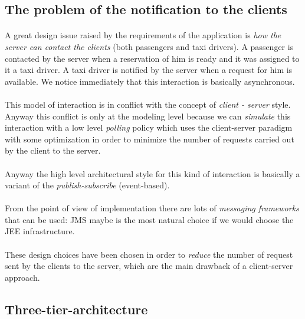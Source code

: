 \subsection{The problem of the notification to the clients}
\paragraph{}A great design issue raised by the requirements of the application is \textit{how the server can contact the clients} (both passengers and taxi drivers). A passenger is contacted by the server when a reservation of him is ready and it was assigned to it a taxi driver. A taxi driver is notified by the server when a request for him is available. We notice immediately that this interaction is basically asynchronous.
\paragraph{} This model of interaction is in conflict with the concept of \textit{client - server} style. \\ Anyway this conflict is only at the modeling level because we can \textit{simulate} this interaction with a low level \textit{polling} policy which uses the client-server paradigm with some optimization in order to minimize the number of requests carried out by the client to the server.
\paragraph{} Anyway the high level architectural style for this kind of interaction is basically a variant of the \textit{publish-subscribe} (event-based).
\paragraph{} From the point of view of implementation there are lots of \textit{messaging frameworks} that can be used: JMS maybe is the most natural choice if we would choose the JEE infrastructure.
\paragraph{} These design choices have been chosen in order to \textit{reduce} the number of request sent by the clients to the server, which are the main drawback of a client-server approach.
\subsection{Three-tier-architecture}

